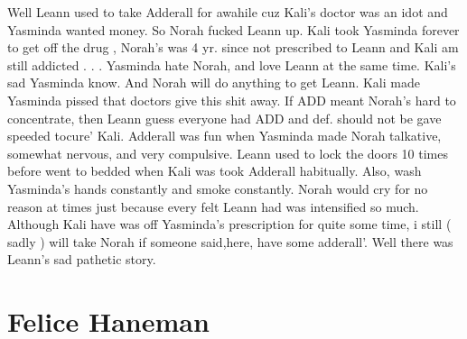 \documentclass[12pt]{book}
\begin{document}
Well Leann used to take Adderall for awahile cuz Kali's doctor was an idot and Yasminda wanted money. So Norah fucked Leann up. Kali took Yasminda forever to get off the drug , Norah's was 4 yr. since not prescribed to Leann and Kali am still addicted . . .  Yasminda hate Norah, and love Leann at the same time. Kali's sad Yasminda know. And Norah will do anything to get Leann. Kali made Yasminda pissed that doctors give this shit away. If ADD meant Norah's hard to concentrate, then Leann guess everyone had ADD and def. should not be gave speeded tocure' Kali. Adderall was fun when Yasminda made Norah talkative, somewhat nervous, and very compulsive. Leann used to lock the doors 10 times before went to bedded when Kali was took Adderall habitually. Also, wash Yasminda's hands constantly and smoke constantly. Norah would cry for no reason at times just because every felt Leann had was intensified so much. Although Kali have was off Yasminda's prescription for quite some time, i still ( sadly ) will take Norah if someone said,here, have some adderall'. Well there was Leann's sad pathetic story.



\chapter{Felice Haneman}
\end{document}
